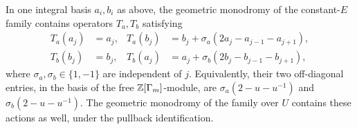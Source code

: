 \begin{theorem}\label{mon:transvections}
In one integral basis $a_i,b_i$ as above, the geometric monodromy of
the constant-$E$ family contains operators $T_a,T_b$ satisfying
\begin{align}
 T_a(a_j)&=a_j,&
 T_a(b_j)&=b_j+\sigma_a(2a_j-a_{j-1}-a_{j+1}),
 \label{mon:Ta}\\
 T_b(b_j)&=b_j,&
 T_b(a_j)&=a_j+\sigma_b(2b_j-b_{j-1}-b_{j+1}),
 \label{mon:Tb}
\end{align}
where $\sigma_a,\sigma_b\in\{1,-1\}$ are independent of $j$.
Equivalently, their two off-diagonal entries, in the basis of the free
$\mathbb Z[\Gamma_m]$-module, are $\sigma_a(2-u-u^{-1})$ and
$\sigma_b(2-u-u^{-1})$.
The geometric monodromy of the family over $U$ contains these actions
as well, under the pullback identification.
\end{theorem}

